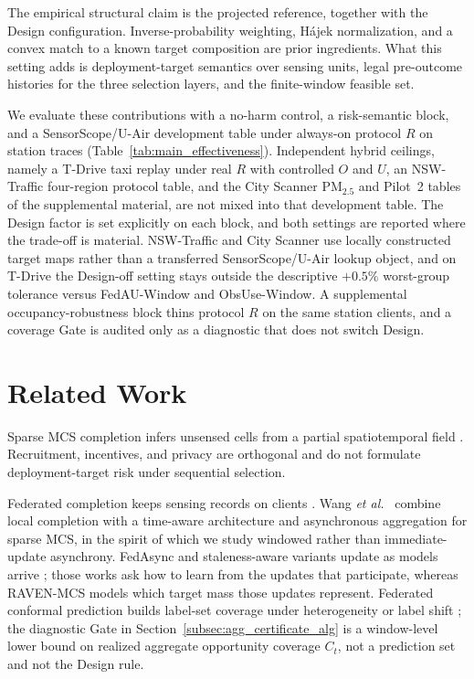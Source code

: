 \documentclass[letterpaper,journal]{IEEEtran}
\begin{document}
The empirical structural claim is the projected reference, together with the
Design configuration.  Inverse-probability weighting, H\'ajek normalization, and
a convex match to a known target composition are prior ingredients.  What this
setting adds is deployment-target semantics over sensing units, legal
pre-outcome histories for the three selection layers, and the finite-window
feasible set.

We evaluate these contributions with a no-harm control, a risk-semantic block,
and a SensorScope/U-Air development table under always-on protocol $R$ on station
traces (Table~\ref{tab:main_effectiveness}).  Independent hybrid ceilings, namely
a T-Drive taxi replay under real $R$ with controlled $O$ and $U$, an NSW-Traffic
four-region protocol table, and the City Scanner {PM}$_{2.5}$ and Pilot~2 tables
of the supplemental material, are not mixed into that development table.  The
Design factor is set explicitly on each block, and both settings are reported
where the trade-off is material.  NSW-Traffic and City Scanner use locally
constructed target maps rather than a transferred SensorScope/U-Air lookup
object, and on T-Drive the Design-off setting stays outside the descriptive
$+0.5\%$ worst-group tolerance versus FedAU-Window and ObsUse-Window.  A
supplemental occupancy-robustness block thins protocol $R$ on the same station
clients, and a coverage Gate is audited only as a diagnostic that does not switch
Design.


\section{Related Work}
\label{sec:related_work}

Sparse MCS completion infers unsensed cells from a partial spatiotemporal
field
\cite{ganti2011mobile,guo2015mobile,ma2014opportunities,wang2023spatiotemporal,wang2023outlier,wang2023transformer,wang2024fewshot,li2024robust,wang2025evolutionary,xu2025rethinking,liu2026pyramid,zhang2026mapt,liu2026pricing}.
Recruitment, incentives, and privacy
\cite{liu2026multidimensional,zhang2025incentive,lu2025piece,zhang2026locally}
are orthogonal and do not formulate deployment-target risk under sequential
selection.

Federated completion keeps sensing records on clients
\cite{mcmahan2017communication,yang2019federated,kairouz2021advances,li2020federated}.
Wang \emph{et al.}~\cite{wang2026federated} combine local completion with a
time-aware architecture and asynchronous aggregation for sparse MCS, in the
spirit of which we study windowed rather than immediate-update asynchrony.
FedAsync and staleness-aware variants update as models arrive
\cite{xie2019asynchronous,liu2023adaptive,sun2024staleness,islam2025seafl,li2026stdfl};
those works ask how to learn from the updates that participate, whereas
RAVEN-MCS models which target mass those updates represent.  Federated conformal
prediction builds label-set coverage under heterogeneity or label shift
\cite{lu2023federated,plassier2023conformal}; the diagnostic Gate in
Section~\ref{subsec:agg_certificate_alg} is a window-level lower bound on
realized aggregate opportunity coverage $C_t$, not a prediction set and not the
Design rule.
\end{document}
